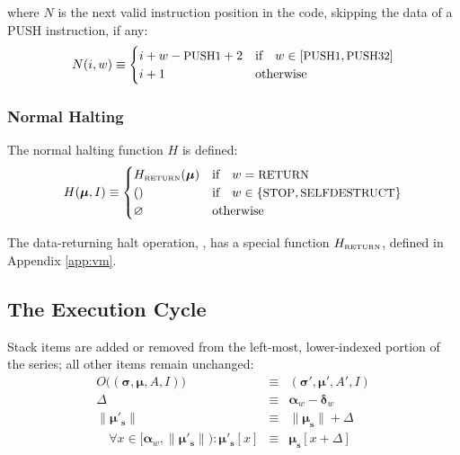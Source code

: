 \documentclass[9pt,oneside]{amsart}
\begin{document}
\begin{multicols}{2}
where $N$ is the next valid instruction position in the code, skipping the data of a {\small PUSH} instruction, if any:
\begin{equation}
N(i, w) \equiv \begin{cases}
i + w - \text{\small PUSH1} + 2 & \text{if} \quad w \in [\text{\small PUSH1}, \text{\small PUSH32}] \\
i + 1 & \text{otherwise} \end{cases}
\end{equation}

\subsubsection{Normal Halting}

The normal halting function $H$ is defined:
\begin{equation}
H(\boldsymbol{\mu}, I) \equiv \begin{cases}
H_{\text{\tiny RETURN}}(\boldsymbol{\mu}) & \text{if} \quad w = \text{\small RETURN} \\
() & \text{if} \quad w \in \{ \text{\small STOP}, \text{\small SELFDESTRUCT} \} \\
\varnothing & \text{otherwise}
\end{cases}
\end{equation}

The data-returning halt operation, , has a special function $H_{\text{\tiny RETURN}}$, defined in Appendix \ref{app:vm}.

\subsection{The Execution Cycle}

Stack items are added or removed from the left-most, lower-indexed portion of the series; all other items remain unchanged:
\begin{eqnarray}
O\big((\boldsymbol{\sigma}, \boldsymbol{\mu}, A, I)\big) & \equiv & (\boldsymbol{\sigma}', \boldsymbol{\mu}', A', I) \\
\Delta & \equiv & \mathbf{\alpha}_w - \mathbf{\delta}_w \\
\lVert\boldsymbol{\mu}'_\mathbf{s}\rVert & \equiv & \lVert\boldsymbol{\mu}_\mathbf{s}\rVert + \Delta \\
\quad \forall x \in [\mathbf{\alpha}_w, \lVert\boldsymbol{\mu}'_\mathbf{s}\rVert): \boldsymbol{\mu}'_\mathbf{s}[x] & \equiv & \boldsymbol{\mu}_\mathbf{s}[x+\Delta]
\end{eqnarray}


\end{multicols}
\end{document}
